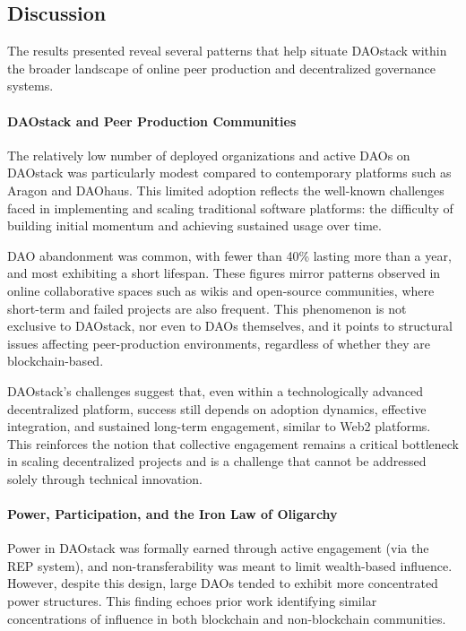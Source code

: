 \documentclass[10pt,lineno]{wlpeerj}
\begin{document}
\subsection{Discussion}
\label{ssec:discussion}

The results presented reveal several patterns that help situate DAOstack within the broader landscape of online peer production and decentralized governance systems.

\paragraph {DAOstack and Peer Production Communities}

The relatively low number of deployed organizations and active DAOs on DAOstack was particularly modest compared to contemporary platforms such as Aragon and DAOhaus. This limited adoption reflects the well-known challenges faced in implementing and scaling traditional software platforms: the difficulty of building initial momentum and achieving sustained usage over time.

DAO abandonment was common, with fewer than 40\% lasting more than a year, and most exhibiting a short lifespan. These figures mirror patterns observed in online collaborative spaces such as wikis and open-source communities, where short-term and failed projects are also frequent. This phenomenon is not exclusive to DAOstack, nor even to DAOs themselves, and it points to structural issues affecting peer-production environments, regardless of whether they are blockchain-based.

DAOstack’s challenges suggest that, even within a technologically advanced decentralized platform, success still depends on adoption dynamics, effective integration, and sustained long-term engagement, similar to Web2 platforms.  This reinforces the notion that collective engagement remains a critical bottleneck in scaling decentralized projects and is a challenge that cannot be addressed solely through technical innovation.

\paragraph{Power, Participation, and the Iron Law of Oligarchy}

Power in DAOstack was formally earned through active engagement (via the REP system), and non-transferability was meant to limit wealth-based influence. However, despite this design, large DAOs tended to exhibit more concentrated power structures. This finding echoes prior work identifying similar concentrations of influence in both blockchain and non-blockchain communities.
\end{document}
